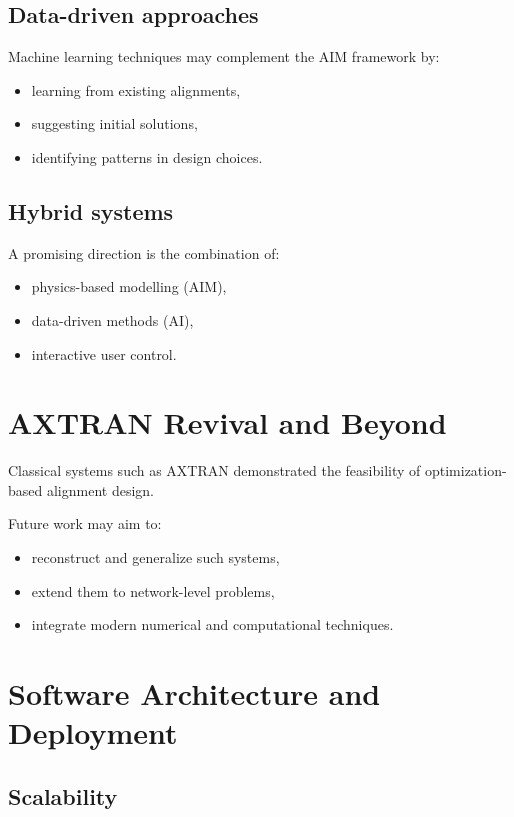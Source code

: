 \subsection{Data-driven approaches}

Machine learning techniques may complement the AIM framework by:
\begin{itemize}
\item learning from existing alignments,
\item suggesting initial solutions,
\item identifying patterns in design choices.
\end{itemize}

\subsection{Hybrid systems}

A promising direction is the combination of:
\begin{itemize}
\item physics-based modelling (AIM),
\item data-driven methods (AI),
\item interactive user control.
\end{itemize}


\section{AXTRAN Revival and Beyond}

Classical systems such as AXTRAN demonstrated the feasibility of
optimization-based alignment design.

Future work may aim to:
\begin{itemize}
\item reconstruct and generalize such systems,
\item extend them to network-level problems,
\item integrate modern numerical and computational techniques.
\end{itemize}


\section{Software Architecture and Deployment}

\subsection{Scalability}

